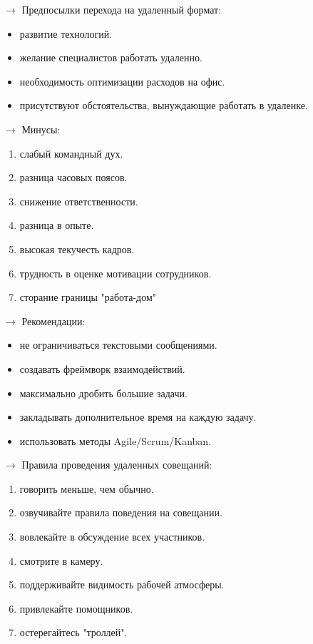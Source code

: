 \documentclass[12pt,a4paper]{report}
\begin{document}
\bigskip 
$\rightarrow$ Предпосылки перехода на удаленный формат:
\begin{itemize}
	\item развитие технологий.
	\item желание специалистов работать удаленно.
	\item необходимость оптимизации расходов на офис.
	\item присутствуют обстоятельства, вынуждающие работать в удаленке. 
\end{itemize}

\smallskip
$\rightarrow$ Минусы:
\begin{enumerate}
	\item слабый командный дух. 
	\item разница часовых поясов.
	\item снижение ответственности.
	\item разница в опыте.
	\item высокая текучесть кадров.
	\item трудность в оценке мотивации сотрудников.
	\item сторание границы "работа-дом"
\end{enumerate}

\newpage
$\rightarrow$ Рекомендации:
\begin{itemize}
	\item не ограничиваться текстовыми сообщениями.
	\item создавать фреймворк взаимодействий.
	\item максимально дробить большие задачи. 
	\item закладывать дополнительное время на каждую задачу.
	\item использовать методы Agile/Scrum/Kanban.
\end{itemize}

\medskip
$\rightarrow$ Правила проведения удаленных совещаний:
\begin{enumerate}
	\item говорить меньше, чем обычно.
	\item озвучивайте правила поведения на совещании.
	\item вовлекайте в обсуждение всех участников.
	\item смотрите в камеру.
	\item поддерживайте видимость рабочей атмосферы.
	\item привлекайте помощников.
	\item остерегайтесь "троллей".
\end{enumerate}
\end{document}
